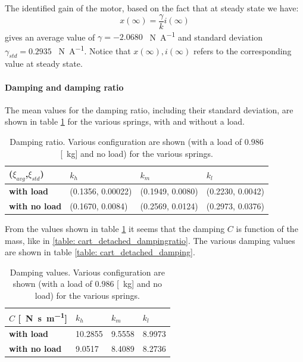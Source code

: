 The identified gain of the motor, based on the fact that at steady state we have:
$$x(\infty) = \frac{\gamma}{k} i(\infty)$$
gives an average value of $\gamma=  -2.0680$ \SI{}{\newton \per \ampere} and standard deviation $\gamma_{std}= 0.2935$ \SI{}{\newton \per \ampere}. Notice that $x(\infty), i(\infty)$ refers to the corresponding value at steady state.


\paragraph{Damping and damping ratio}
The mean values for the damping ratio, including their standard deviation, are shown in table \ref{table: cart_attached_dampingratio} for the various springs, with and without a load.
\begin{table}[!h]
\centering

\label{table: cart_attached_dampingratio}
\begin{tabular}{|l|l|l|l|}
\hline
{(\textbf{$\xi_{avg}$},$\xi_{std}$)} & \textbf{$k_h$} & \textbf{$k_m$}   & \textbf{$k_l$}   \\ \hline
\textbf{with load}         & (0.1356,  0.00022)    & (0.1949, 0.0080) & (0.2230, 0.0042) \\ \hline
\textbf{with no load}      & (0.1670, 0.0084)    & (0.2569, 0.0124) & (0.2973, 0.0376)      \\ \hline
\end{tabular}
\caption{Damping ratio. Various configuration are shown (with a load of $0.986$ [\SI{}{\kilo \gram}] and no load) for the various springs. }
\end{table}


From the values shown in table \ref{table: cart_attached_dampingratio} it seems that the damping $C$ is function of the mass, like in \ref{table: cart_detached_dampingratio}. The various damping values are shown in table 
\ref{table: cart_detached_damping}.
\begin{table}[!h]
\centering
\label{table: cart_attached_damping}
\begin{tabular}{|l|l|l|l|}
\hline
{$C$ [\SI{}{\newton \second \per \metre}]} & \textbf{$k_h$} & \textbf{$k_m$}   & \textbf{$k_l$}   \\ \hline
\textbf{with load}         &  10.2855    & 9.5558 & 8.9973 \\ \hline
\textbf{with no load}      & 9.0517 &    8.4089 &   8.2736      \\ \hline
\end{tabular}
\caption{Damping values. Various configuration are shown (with a load of $0.986$ [\SI{}{\kilo \gram}] and no load) for the various springs. }
\end{table}

